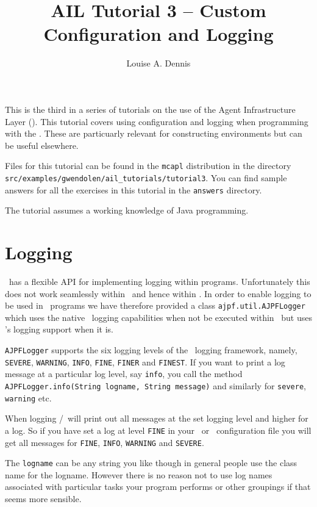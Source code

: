 \documentclass[a4]{article}
\author{Louise A. Dennis}
\title{AIL Tutorial 3 -- Custom Configuration and Logging}
\begin{document}
\maketitle
This is the third in a series of tutorials on the use of the Agent Infrastructure Layer (\ail).  This tutorial covers using configuration and logging when programming with the \ail.  These are particuarly relevant for constructing environments but can be useful elsewhere.

Files for this tutorial can be found in the \texttt{mcapl} distribution in the directory \texttt{src/examples/gwendolen/ail\_tutorials/tutorial3}.  You can find sample answers for all the exercises in this tutorial in the \texttt{answers} directory.

The tutorial assumes a working knowledge of Java programming.

\section{Logging}
\java\ has a flexible API for implementing logging within programs.  Unfortunately this does not work seamlessly within \jpf\ and hence within \ajpf.  In order to enable logging to be used in \ail\ programs we have therefore provided a class \texttt{ajpf.util.AJPFLogger} which uses the native \java\ logging capabilities when not be executed within \ajpf\ but uses \jpf's logging support when it is.

\begin{sloppypar}
\texttt{AJPFLogger} supports the six logging levels of the \java\ logging framework, namely, \texttt{SEVERE}, \texttt{WARNING}, \texttt{INFO}, \texttt{FINE}, \texttt{FINER} and \texttt{FINEST}.  If you want to print a log message at a particular log level, say \texttt{info}, you call the method \texttt{AJPFLogger.info(String logname, String message)} and similarly for \texttt{severe}, \texttt{warning} etc.
\end{sloppypar}

When logging \java/\jpf\ will print out all messages at the set logging level and higher for a log.  So if you have set a log at level \texttt{FINE} in your \ail\ or \jpf\ configuration file you will get all messages for \texttt{FINE}, \texttt{INFO}, \texttt{WARNING} and \texttt{SEVERE}.

The \texttt{logname} can be any string you like though in general people use the class name for the logname.  However there is no reason not to use log names associated with particular tasks your program performs or other groupings if that seems more sensible.
\end{document}
